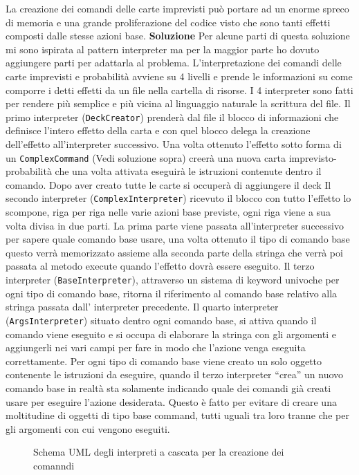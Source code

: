 La creazione dei comandi delle carte imprevisti può portare ad un enorme spreco di memoria e una grande proliferazione del codice visto che sono tanti effetti composti dalle stesse azioni base.  \newline
\textbf{Soluzione}\newline
Per alcune parti di questa soluzione mi sono ispirata al pattern interpreter ma per la maggior parte ho dovuto aggiungere parti per adattarla al problema. 
L’interpretazione dei comandi delle carte imprevisti e probabilità avviene su 4 livelli e prende le informazioni su come comporre i detti effetti da un file nella cartella di risorse. 
I 4 interpreter sono fatti per rendere più semplice e più vicina al linguaggio naturale la scrittura del file. 
Il primo interpreter (\texttt{DeckCreator}) prenderà dal file il blocco di informazioni che definisce l’intero effetto della carta e con quel blocco delega la creazione dell’effetto all’interpreter successivo. Una volta ottenuto l’effetto sotto forma di un \texttt{ComplexCommand} (Vedi soluzione sopra) creerà una nuova carta imprevisto-probabilità che una volta attivata eseguirà le istruzioni contenute dentro il comando. Dopo aver creato tutte le carte si occuperà di aggiungere il deck
Il secondo interpreter (\texttt{ComplexInterpreter}) ricevuto il blocco con tutto l’effetto lo scompone, riga per riga nelle varie azioni base previste, ogni riga viene a sua volta divisa in due parti. 
La prima parte viene passata all’interpreter successivo per sapere quale comando base usare, una volta ottenuto il tipo di comando base questo verrà memorizzato assieme alla seconda parte della stringa che verrà poi passata al metodo execute quando l’effetto dovrà essere eseguito.  
Il terzo interpreter (\texttt{BaseInterpreter}), attraverso un sistema di keyword univoche per ogni tipo di comando base, ritorna il riferimento al comando base relativo alla stringa passata dall’ interpreter precedente.
Il quarto interpreter (\texttt{ArgsInterpreter}) situato dentro ogni comando base, si attiva quando il comando viene eseguito e si occupa di elaborare la stringa con gli argomenti e aggiungerli nei vari campi per fare in modo che l’azione venga eseguita correttamente.
Per ogni tipo di comando base viene creato un solo oggetto contenente le istruzioni da eseguire, quando il terzo interpreter “crea” un nuovo comando base in realtà sta solamente indicando quale dei comandi già creati usare per eseguire l’azione desiderata.
Questo è fatto per evitare di creare una moltitudine di oggetti di tipo base command, tutti uguali tra loro tranne che per gli argomenti con cui vengono eseguiti.
\begin{figure}[H]
    \centering
    \caption{Schema UML degli interpreti a cascata per la creazione dei comanndi}
    \label{img:ArchitectureDiagram-Pagina-5}
\end{figure}
